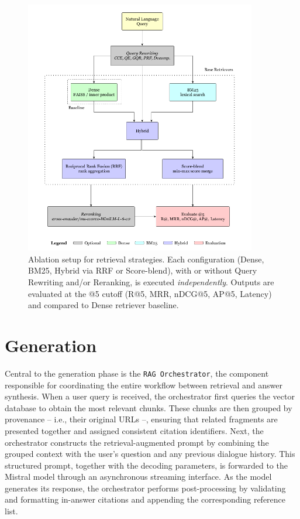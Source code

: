 \begin{spacing}{1.5}
\begin{figure}[H]
  \centering
  \includegraphics[width=0.9\textwidth]{images/evaluation_diagram.png} 
  \caption{Ablation setup for retrieval strategies. Each configuration (Dense, BM25, Hybrid via RRF or Score-blend), with or without Query Rewriting and/or Reranking, is executed \emph{independently}. Outputs are evaluated at the @5 cutoff (R@5, MRR, nDCG@5, AP@5, Latency) and compared to Dense retriever baseline.}
  \label{fig:ablation-setup}
\end{figure}



\section{Generation}\label{sec:rag_generation}
Central to the generation phase is the \texttt{RAG Orchestrator}, the component responsible for coordinating the entire workflow between retrieval and answer synthesis. When a user query is received, the orchestrator first queries the vector database to obtain the most relevant chunks. These chunks are then grouped by provenance -- i.e., their original URLs --, ensuring that related fragments are presented together and assigned consistent citation identifiers. Next, the orchestrator constructs the retrieval-augmented prompt by combining the grouped context with the user’s question and any previous dialogue history. This structured prompt, together with the decoding parameters, is forwarded to the Mistral model through an asynchronous streaming interface. As the model generates its response, the orchestrator performs post-processing by validating and formatting in-answer citations and appending the corresponding reference list.


\end{spacing}
